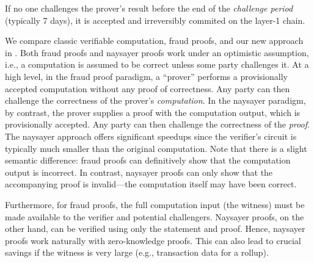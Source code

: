 If no one challenges the prover's result before the end of the \emph{challenge period} (typically 7 days), it is accepted and irreversibly commited on the layer-1 chain.






We compare classic verifiable computation, fraud proofs, and our new approach in . 
Both fraud proofs and naysayer proofs work under an optimistic assumption, i.e., a computation is assumed to be correct unless some party challenges it. 
At a high level, in the fraud proof paradigm, a ``prover'' performs a provisionally accepted computation without any proof of correctness. Any party can then challenge the correctness of the prover's \emph{computation}. %
In the naysayer paradigm, by contrast, the prover supplies a proof with the computation output, which is provisionally accepted. Any party can then challenge the correctness of the \emph{proof}. %
The naysayer approach offers significant speedups since the verifier's circuit is typically much smaller than the original computation. 
Note that there is a slight semantic difference: fraud proofs can definitively show that the computation output is incorrect. In contrast, naysayer proofs can only show that the accompanying proof is invalid---the computation itself may have been correct.

Furthermore, for fraud proofs, the full computation input (the witness) must be made available to the verifier and potential challengers. %
Naysayer proofs, on the other hand, 
can be verified using only the statement and proof. 
Hence, naysayer proofs work naturally with zero-knowledge proofs.
This can also lead to crucial savings if the witness is very large %
(e.g., transaction data for a rollup).

